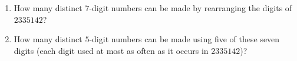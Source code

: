 \begin{enumerate}
\item[(a)] How many distinct $7$-digit numbers can be made by rearranging the digits of $2335142$?
\item[(b)] How many distinct $5$-digit numbers can be made using five of these seven digits (each digit used at most as often as it occurs in $2335142$)?
\end{enumerate}
